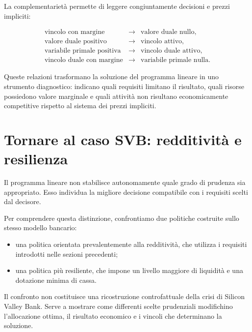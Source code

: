 \begin{remark}

La complementariet\`a permette di leggere congiuntamente decisioni e prezzi
impliciti:

\[
\begin{array}{ccl}
\text{vincolo con margine}
&
\longrightarrow
&
\text{valore duale nullo},
\\[3pt]
\text{valore duale positivo}
&
\longrightarrow
&
\text{vincolo attivo},
\\[3pt]
\text{variabile primale positiva}
&
\longrightarrow
&
\text{vincolo duale attivo},
\\[3pt]
\text{vincolo duale con margine}
&
\longrightarrow
&
\text{variabile primale nulla}.
\end{array}
\]

Queste relazioni trasformano la soluzione del programma lineare in uno
strumento diagnostico: indicano quali requisiti limitano il risultato, quali
risorse possiedono valore marginale e quali attivit\`a non risultano
economicamente competitive rispetto al sistema dei prezzi impliciti.

\end{remark}

\section{Tornare al caso SVB: redditivit\`a e resilienza}

\label{sec:cap11-svb-redditivita-resilienza}

Il programma lineare non stabilisce autonomamente quale grado di prudenza sia
appropriato. Esso individua la migliore decisione compatibile con i requisiti
scelti dal decisore.

Per comprendere questa distinzione, confrontiamo due politiche costruite sullo
stesso modello bancario:

\begin{itemize}

\item una politica orientata prevalentemente alla redditivit\`a, che utilizza
i requisiti introdotti nelle sezioni precedenti;

\item una politica pi\`u resiliente, che impone un livello maggiore di
liquidit\`a e una dotazione minima di cassa.

\end{itemize}

Il confronto non costituisce una ricostruzione controfattuale della crisi di
Silicon Valley Bank. Serve a mostrare come differenti scelte prudenziali
modifichino l'allocazione ottima, il risultato economico e i vincoli che
determinano la soluzione.

